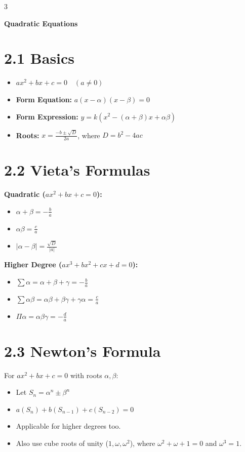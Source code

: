 \documentclass[11pt,a4paper,landscape]{article}
\begin{document}
\newpage
\begin{multicols*}{3}

\textbf{\Huge Quadratic Equations}

\section*{2.1 Basics}
\begin{itemize}
\item $ax^2+bx+c=0 \quad (a\neq0)$
\item \textbf{Form Equation:} $a(x-\alpha)(x-\beta)=0$
\item \textbf{Form Expression:} $y = k(x^2 - (\alpha+\beta)x + \alpha\beta)$
\item \textbf{Roots:} $x = \frac{-b \pm \sqrt{D}}{2a}$, where $D = b^2-4ac$
\end{itemize}

\section*{2.2 Vieta's Formulas}
\textbf{Quadratic ($ax^2+bx+c=0$):}
\begin{itemize}
\item $\alpha+\beta = -\frac{b}{a}$
\item $\alpha\beta = \frac{c}{a}$
\item $|\alpha-\beta| = \frac{\sqrt{D}}{|a|}$
\end{itemize}

\textbf{Higher Degree ($ax^3+bx^2+cx+d=0$):}
\begin{itemize}
\item $\sum \alpha = \alpha+\beta+\gamma = -\frac{b}{a}$
\item $\sum \alpha\beta = \alpha\beta+\beta\gamma+\gamma\alpha = \frac{c}{a}$
\item $\Pi \alpha = \alpha\beta\gamma = -\frac{d}{a}$
\end{itemize}

\section*{2.3 Newton's Formula}
For $ax^2+bx+c=0$ with roots $\alpha, \beta$:
\begin{itemize}
\item Let $S_n = \alpha^n \pm \beta^n$
\item $a(S_n) + b(S_{n-1}) + c(S_{n-2}) = 0$
\item Applicable for higher degrees too.
\item Also use cube roots of unity ($1, \omega, \omega^2$), where $\omega^2+\omega+1=0$ and $\omega^3=1$.
\end{itemize}


\end{multicols*}
\end{document}
